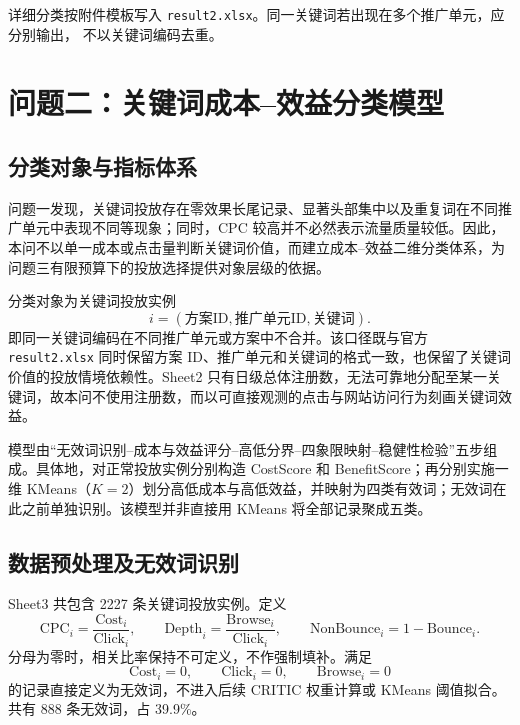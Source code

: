 \documentclass[UTF8,a4paper,zihao=-4]{ctexart}
\begin{document}
详细分类按附件模板写入 \texttt{result2.xlsx}。同一关键词若出现在多个推广单元，应分别输出，
不以关键词编码去重。

\fi

\section{问题二：关键词成本--效益分类模型}

\subsection{分类对象与指标体系}

问题一发现，关键词投放存在零效果长尾记录、显著头部集中以及重复词在不同推广单元中表现不同等现象；同时，CPC 较高并不必然表示流量质量较低。因此，本问不以单一成本或点击量判断关键词价值，而建立成本--效益二维分类体系，为问题三有限预算下的投放选择提供对象层级的依据。

分类对象为关键词投放实例
\begin{equation}
  i=(\text{方案ID},\text{推广单元ID},\text{关键词}).
  \label{eq:q2-instance}
\end{equation}
即同一关键词编码在不同推广单元或方案中不合并。该口径既与官方 \texttt{result2.xlsx} 同时保留方案 ID、推广单元和关键词的格式一致，也保留了关键词价值的投放情境依赖性。Sheet2 只有日级总体注册数，无法可靠地分配至某一关键词，故本问不使用注册数，而以可直接观测的点击与网站访问行为刻画关键词效益。

模型由“无效词识别--成本与效益评分--高低分界--四象限映射--稳健性检验”五步组成。具体地，对正常投放实例分别构造 CostScore 和 BenefitScore；再分别实施一维 KMeans（$K=2$）划分高低成本与高低效益，并映射为四类有效词；无效词在此之前单独识别。该模型并非直接用 KMeans 将全部记录聚成五类。

\subsection{数据预处理及无效词识别}

Sheet3 共包含 2227 条关键词投放实例。定义
\begin{equation}
  \mathrm{CPC}_i=\frac{\mathrm{Cost}_i}{\mathrm{Click}_i},\qquad
  \mathrm{Depth}_i=\frac{\mathrm{Browse}_i}{\mathrm{Click}_i},\qquad
  \mathrm{NonBounce}_i=1-\mathrm{Bounce}_i.
  \label{eq:q2-basic-index}
\end{equation}
分母为零时，相关比率保持不可定义，不作强制填补。满足
\begin{equation}
  \mathrm{Cost}_i=0,\qquad \mathrm{Click}_i=0,\qquad \mathrm{Browse}_i=0
  \label{eq:q2-invalid}
\end{equation}
的记录直接定义为无效词，不进入后续 CRITIC 权重计算或 KMeans 阈值拟合。共有 888 条无效词，占 39.9\%。
\end{document}
